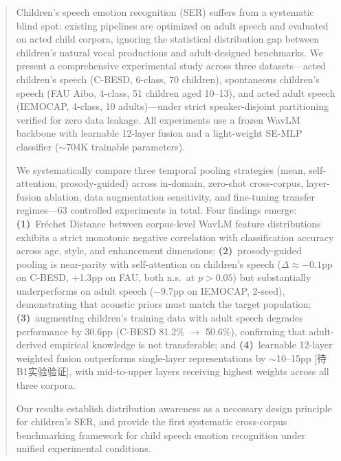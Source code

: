 
\begin{abstract}
Children's speech emotion recognition (SER) suffers from a systematic blind
spot: existing pipelines are optimized on adult speech and evaluated on acted
child corpora, ignoring the statistical distribution gap between children's
natural vocal productions and adult-designed benchmarks. We present a
comprehensive experimental study across three datasets---acted children's
speech (C-BESD, 6-class, 70 children), spontaneous children's speech (FAU
Aibo, 4-class, 51 children aged 10--13), and acted adult speech (IEMOCAP,
4-class, 10 adults)---under strict speaker-disjoint partitioning verified for
zero data leakage. All experiments use a frozen WavLM backbone with learnable
12-layer fusion and a light-weight SE-MLP classifier ($\sim$704K trainable
parameters).

We systematically compare three temporal pooling strategies (mean, self-attention,
prosody-guided) across in-domain, zero-shot cross-corpus, layer-fusion ablation,
data augmentation sensitivity, and fine-tuning transfer regimes---63 controlled
experiments in total. Four findings emerge: \textbf{(1)}~Fr\'{e}chet Distance
between corpus-level WavLM feature distributions exhibits a strict monotonic
negative correlation with classification accuracy across age, style, and
enhancement dimensions; \textbf{(2)}~prosody-guided pooling is near-parity with self-attention on
children's speech ($\Delta \approx -0.1$pp on C-BESD, +1.3pp on FAU, both
n.s.\ at $p>0.05$) but substantially underperforms on adult speech
($-9.7$pp on IEMOCAP, 2-seed), demonstrating that acoustic priors
must match the target population; \textbf{(3)}~augmenting children's training
data with adult speech degrades performance by 30.6pp (C-BESD 81.2\% $\rightarrow$ 50.6\%),
confirming that adult-derived empirical knowledge is not transferable; and
\textbf{(4)}~learnable 12-layer weighted fusion outperforms single-layer
representations by $\sim$10--15pp [待B1实验验证], with mid-to-upper layers
receiving highest weights across all three corpora.

Our results establish distribution awareness as a necessary design principle
for children's SER, and provide the first systematic cross-corpus benchmarking
framework for child speech emotion recognition under unified experimental
conditions.
\end{abstract}
